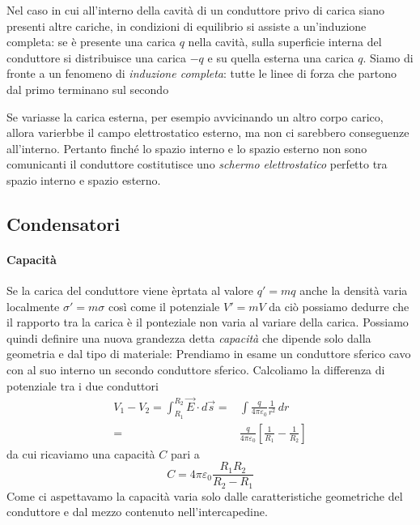 \documentclass[x11names]{report}
\begin{document}
\noindent
Nel caso in cui all'interno della cavità di un conduttore privo di carica siano presenti altre cariche, in condizioni di equilibrio si assiste a un'induzione completa: se è presente una carica \(q\) nella cavità, sulla superficie interna del conduttore si distribuisce una carica \(-q\) e su quella esterna una carica \(q\). Siamo di fronte a un fenomeno di \textit{induzione completa}: tutte le linee di forza che partono dal primo terminano sul secondo
\begin{figure}[H]
	\centering
\end{figure}

Se variasse la carica esterna, per esempio avvicinando un altro corpo carico, allora varierbbe il campo elettrostatico esterno, ma non ci sarebbero conseguenze all'interno. Pertanto finché lo spazio interno e lo spazio esterno non sono comunicanti il conduttore costitutisce uno \textit{schermo elettrostatico} perfetto tra spazio interno e spazio esterno.

\subsection{Condensatori}
\paragraph{Capacità}
Se la carica del conduttore viene èprtata al valore \(q' = mq\) anche la densità varia localmente \(\sigma'=m\sigma\) così come il potenziale \(V'=mV\) da ciò possiamo dedurre che il rapporto tra la carica è il ponteziale non varia al variare della carica. Possiamo quindi definire una nuova grandezza detta \textit{capacità} che dipende solo dalla geometria e dal tipo di materiale:
Prendiamo in esame un conduttore sferico cavo con al suo interno un secondo conduttore sferico. Calcoliamo la differenza di potenziale tra i due conduttori
\begin{align*}
	V_1 - V_2 = \int_{R_1}^{R_2} \vec{E}\cdot d\vec{s} =& \int \frac{q}{4\pi \varepsilon_0} \frac{1}{r^2} \, dr \\
	=& \frac{q}{4\pi \varepsilon_0}\left[\frac{1}{R_1} - \frac{1}{R_2}\right]
\end{align*}
da cui ricaviamo una capacità \(C\) pari a 
\[
C = 4\pi\varepsilon_0\frac{R_1R_2}{R_2 - R_1}
\]
Come ci aspettavamo la capacità varia solo dalle caratteristiche geometriche del conduttore e dal mezzo contenuto nell'intercapedine. 
\end{document}
